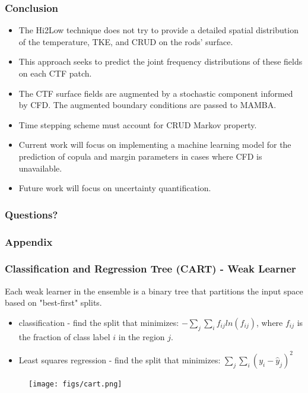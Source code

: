 \documentclass[t, pdftex]{beamer}
\begin{document}
\begin{frame}
\frametitle{Conclusion}
\begin{itemize}
\item The Hi2Low technique does not try to provide a detailed spatial distribution
of the temperature, TKE, and CRUD on the rods' surface.
\item This approach seeks to predict the joint frequency distributions of these fields on each CTF patch.
\item The CTF surface fields are augmented by a stochastic component informed by CFD.  The augmented boundary conditions are passed to MAMBA.
\item Time stepping scheme must account for CRUD Markov property.
\item Current work will focus on implementing a machine learning model for the prediction of copula and margin parameters in cases where CFD is unavailable.
\item Future work will focus on uncertainty quantification.
\end{itemize}
\end{frame}

\begin{frame}
\frametitle{Questions?}
\end{frame}

\lastframe%

\begin{frame}
\frametitle{Appendix}
\end{frame}

\begin{frame}[shrink=10]
\frametitle{Classification and Regression Tree (CART) - Weak Learner}
Each weak learner in the ensemble is a binary tree that partitions the input space based on "best-first" splits.  
\begin{itemize}
\item classification - find the split that minimizes: $-\sum_j\sum_i f_{ij} ln(f_{ij})$, where $f_{ij}$ is the fraction of class label $i$ in the region $j$.
\item Least squares regression - find the split that minimizes: $\sum_j\sum_i(y_i - \hat y_{j})^2$
\end{itemize}

\begin{figure}[!htbp]
\centering
\texttt{[image: figs/cart.png]}
\label{model_overview}
\end{figure}
\end{frame}
\end{document}
